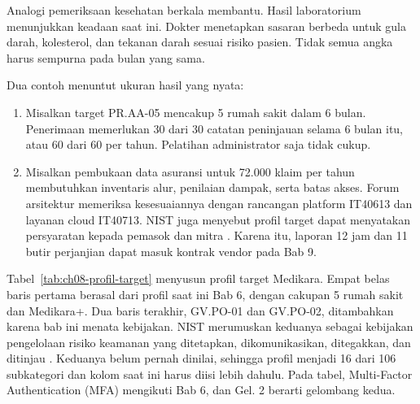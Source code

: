 Analogi pemeriksaan kesehatan berkala membantu. Hasil laboratorium menunjukkan keadaan saat ini.
Dokter menetapkan sasaran berbeda untuk gula darah, kolesterol, dan tekanan darah sesuai risiko
pasien. Tidak semua angka harus sempurna pada bulan yang sama.

Dua contoh menuntut ukuran hasil yang nyata:
\begin{enumerate}
  \item Misalkan target PR.AA-05 mencakup 5 rumah sakit dalam 6 bulan. Penerimaan memerlukan 30
  dari 30 catatan peninjauan selama 6 bulan itu, atau 60 dari 60 per tahun. Pelatihan
  administrator saja tidak cukup.
  \item Misalkan pembukaan data asuransi untuk 72.000 klaim per tahun membutuhkan inventaris
  alur, penilaian dampak, serta batas akses. Forum arsitektur memeriksa kesesuaiannya dengan
  rancangan platform IT40613 dan layanan cloud IT40713. NIST juga menyebut profil target dapat
  menyatakan persyaratan kepada pemasok dan mitra \cite{nistcsf2}. Karena itu, laporan 12 jam
  dan 11 butir perjanjian dapat masuk kontrak vendor pada Bab 9.
\end{enumerate}

Tabel~\ref{tab:ch08-profil-target} menyusun profil target Medikara. Empat belas baris pertama
berasal dari profil saat ini Bab 6, dengan cakupan 5 rumah sakit dan Medikara+. Dua baris
terakhir, GV.PO-01 dan GV.PO-02, ditambahkan karena bab ini menata kebijakan. NIST merumuskan
keduanya sebagai kebijakan pengelolaan risiko keamanan yang ditetapkan, dikomunikasikan,
ditegakkan, dan ditinjau \cite{nistcsf2}. Keduanya belum pernah dinilai, sehingga profil menjadi
16 dari 106 subkategori dan kolom saat ini harus diisi lebih dahulu. Pada tabel, Multi-Factor
Authentication (MFA) mengikuti Bab 6, dan Gel. 2 berarti gelombang kedua.

